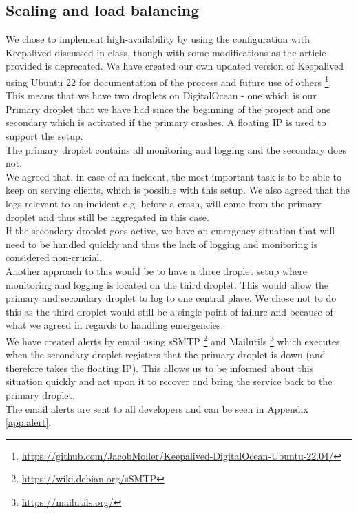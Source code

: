 \subsection{Scaling and load balancing}
We chose to implement high-availability by using the configuration with Keepalived discussed in class, though with some modifications as the article\cite{KeepalivedUbuntu14} provided is deprecated. We have created our own updated version of Keepalived using Ubuntu 22 for documentation of the process and future use of others \footnote{\url{https://github.com/JacobMoller/Keepalived-DigitalOcean-Ubuntu-22.04/}}. \\
This means that we have two droplets on DigitalOcean - one which is our Primary droplet that we have had since the beginning of the project and one secondary which is activated if the primary crashes. A floating IP is used to support the setup.\\
The primary droplet contains all monitoring and logging and the secondary does not. \\
We agreed that, in case of an incident, the most important task is to be able to keep on serving clients, which is possible with this setup. We also agreed that the logs relevant to an incident e.g. before a crash, will come from the primary droplet and thus still be aggregated in this case.\\ If the secondary droplet goes active, we have an emergency situation that will need to be handled quickly and thus the lack of logging and monitoring is considered non-crucial. \\

Another approach to this would be to have a three droplet setup where monitoring and logging is located on the third droplet. This would allow the primary and secondary droplet to log to one central place. We chose not to do this as the third droplet would still be a single point of failure and because of what we agreed in regards to handling emergencies.\\

We have created alerts by email using sSMTP \footnote{\url{https://wiki.debian.org/sSMTP}} and Mailutils \footnote{\url{https://mailutils.org/}} which executes when the secondary droplet registers that the primary droplet is down (and therefore takes the floating IP). This allows us to be informed about this situation quickly and act upon it to recover and bring the service back to the primary droplet. \\
The email alerts are sent to all developers and can be seen in Appendix \ref{app:alert}.




